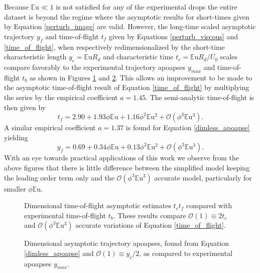 \documentclass[aip,reprint, floatfix]{revtex4-1}
\begin{document}
Because $\mathbb{E}\mbox{u} \ll 1$ is not satisfied for any of the experimental drops the entire dataset is beyond the regime where the asymptotic results for short-times given by Equation \ref{perturb_image} are valid. However, the long-time scaled asymptotic trajectory   $y_f$ and time-of-flight $t_f$ given by Equations \ref{perturb_viscous} and \ref{time_of_flight}, when respectively redimensionalized by the short-time characteristic length $y_c=\mathbb{E}\mbox{u} R_d$ and characteristic time $t_c=\mathbb{E}\mbox{u} R_d / U_0$ scales compare favorably to the experimental trajectory apoapses $y_{max}$ and time-of-flight $t_b$ as shown in Figures \ref{fig:times2} and \ref{fig:ymaxes}. This allows an improvement to be made to the asymptotic time-of-flight result of Equation \ref{time_of_flight} by multiplying the series by the empirical coefficient $a = 1.45$. The semi-analytic time-of-flight is then given by
\begin{equation}
\label{time_improved}
t_f = 2.90 + 1.93\phi\mathbb{E}\mbox{u} + 1.16\phi^2\mathbb{E}\mbox{u}^{2} + \mathcal{O}(\phi^3\mathbb{E}\mbox{u}^{3}).
\end{equation}
A similar empirical coefficient $a = 1.37$ is found for Equation \ref{dimless_apoapse} yielding
\begin{equation}
\label{y_max_improved}
y_f = 0.69 + 0.34\phi\mathbb{E}\mbox{u} + 0.13\phi^2\mathbb{E}\mbox{u}^{2} + \mathcal{O}(\phi^3\mathbb{E}\mbox{u}^{3}).
\end{equation}
With an eye towards practical applications of this work we observe from the above figures that there is little difference between the simplified model keeping the leading order term only and the $\mathcal{O}(\phi^3\mathbb{E}\mbox{u}^{3})$ accurate model, particularly for smaller $\phi\mathbb{E}\mbox{u}$.

\begin{figure}[htb]
    \centering
    \resizebox{0.5\textwidth}{!}{}
    \caption{Dimensional time-of-flight asymptotic estimates $t_c t_f$ compared with experimental time-of-flight $t_b$. These results compare $\mathcal{O}(1) \equiv 2 t_c$ and $\mathcal{O}(\phi^3\mathbb{E}\mbox{u}^{3})$ accurate variations of Equation \ref{time_of_flight}. \label{fig:times2}}
\end{figure}
\begin{figure}[htb]
    \centering
    \resizebox{0.5\textwidth}{!}{}
    \caption{Dimensional asymptotic trajectory apoapses, found from Equation \ref{dimless_apoapse} and $\mathcal{O}(1) \equiv y_c/2$, as compared to experimental apoapses $y_{max}$. \label{fig:ymaxes}}
\end{figure}
\end{document}
